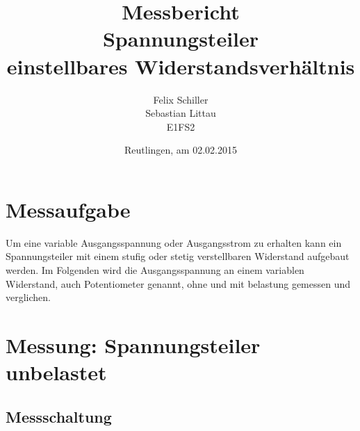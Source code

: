\documentclass[
a4paper,     %
 headsepline, %
11pt         %
]{scrartcl}  %
\title{Messbericht \\ Spannungsteiler \\ einstellbares Widerstandsverhältnis}
\author{Felix Schiller \\ Sebastian Littau \\ E1FS2}
\date{Reutlingen, am 02.02.2015}
\begin{document}

\maketitle

\newpage
\tableofcontents





\section{Messaufgabe}
Um eine variable Ausgangsspannung oder Ausgangsstrom zu erhalten kann ein Spannungsteiler mit einem stufig oder stetig  verstellbaren Widerstand aufgebaut werden. Im Folgenden wird die Ausgangsspannung an einem variablen Widerstand, auch Potentiometer genannt, ohne und mit belastung gemessen und verglichen.

\section{Messung: Spannungsteiler unbelastet}
\subsection{Messschaltung}
\end{document}
